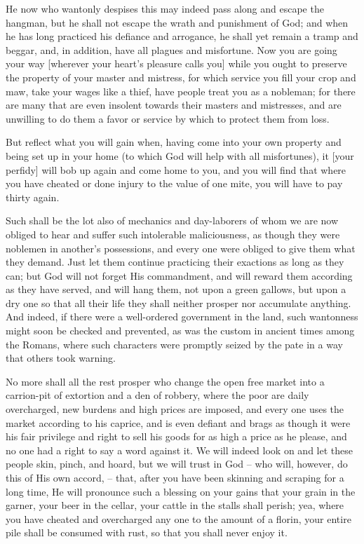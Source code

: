 He now who wantonly despises this may indeed pass along and escape the
hangman, but he shall not escape the wrath and punishment of God; and
when he has long practiced his defiance and arrogance, he shall yet
remain a tramp and beggar, and, in addition, have all plagues and
misfortune. Now you are going your way [wherever your heart's pleasure
calls you] while you ought to preserve the property of your master and
mistress, for which service you fill your crop and maw, take your wages
like a thief, have people treat you as a nobleman; for there are many
that are even insolent towards their masters and mistresses, and are
unwilling to do them a favor or service by which to protect them from
loss.

But reflect what you will gain when, having come into your own
property and being set up in your home (to which God will help with all
misfortunes), it [your perfidy] will bob up again and come home to you,
and you will find that where you have cheated or done injury to the
value of one mite, you will have to pay thirty again.

Such shall be the lot also of mechanics and day-laborers of whom we are
now obliged to hear and suffer such intolerable maliciousness, as
though they were noblemen in another's possessions, and every one were
obliged to give them what they demand. Just let them continue
practicing their exactions as long as they can; but God will not forget
His commandment, and will reward them according as they have served,
and will hang them, not upon a green gallows, but upon a dry one so
that all their life they shall neither prosper nor accumulate anything.
And indeed, if there were a well-ordered government in the land, such
wantonness might soon be checked and prevented, as was the custom in
ancient times among the Romans, where such characters were promptly
seized by the pate in a way that others took warning.

No more shall all the rest prosper who change the open free market into
a carrion-pit of extortion and a den of robbery, where the poor are
daily overcharged, new burdens and high prices are imposed, and every
one uses the market according to his caprice, and is even defiant and
brags as though it were his fair privilege and right to sell his goods
for as high a price as he please, and no one had a right to say a word
against it. We will indeed look on and let these people skin, pinch,
and hoard, but we will trust in God -- who will, however, do this of
His own accord, -- that, after you have been skinning and scraping for
a long time, He will pronounce such a blessing on your gains that your
grain in the garner, your beer in the cellar, your cattle in the stalls
shall perish; yea, where you have cheated and overcharged any one to
the amount of a florin, your entire pile shall be consumed with rust,
so that you shall never enjoy it.


